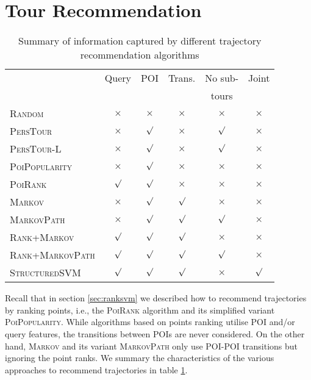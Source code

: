 \section{Tour Recommendation}
\label{sec:recommendation}

\begin{table}[b]
\caption{Summary of information captured by different trajectory recommendation algorithms}
\label{tab:algsummary}
\centering
\setlength{\tabcolsep}{3pt} %
\begin{tabular}{l|*{5}{c}} \hline
                                & Query    & POI      & Trans.     & No sub-      & Joint    \\
                                &          &          &            & tours        &          \\ \hline
\textsc{Random}                 & $\times$ & $\times$ & $\times$   & $\times$     & $\times$ \\
\textsc{PersTour}\cite{ijcai15} & $\times$ & $\surd$  & $\times$   & $\surd$      & $\times$ \\
\textsc{PersTour-L}             & $\times$ & $\surd$  & $\times$   & $\surd$      & $\times$ \\
\textsc{PoiPopularity}          & $\times$ & $\surd$  & $\times$   & $\times$     & $\times$ \\
\textsc{PoiRank}                & $\surd$  & $\surd$  & $\times$   & $\times$     & $\times$ \\
\textsc{Markov}                 & $\times$ & $\surd$  & $\surd$    & $\times$     & $\times$ \\
\textsc{MarkovPath}             & $\times$ & $\surd$  & $\surd$    & $\surd$      & $\times$ \\
\textsc{Rank+Markov}            & $\surd$  & $\surd$  & $\surd$    & $\times$     & $\times$ \\
\textsc{Rank+MarkovPath}        & $\surd$  & $\surd$  & $\surd$    & $\surd$      & $\times$ \\
\textsc{StructuredSVM}          & $\surd$  & $\surd$  & $\surd$    & $\times$     & $\surd$  \\ \hline
\end{tabular}
\end{table}


Recall that in section \ref{sec:ranksvm} we described how to recommend trajectories by ranking points,
i.e., the \textsc{PoiRank} algorithm and its simplified variant \textsc{PoiPopularity}.
While algorithms based on points ranking utilise POI and/or query features, 
the transitions between POIs are never considered.
On the other hand, \textsc{Markov} and its variant \textsc{MarkovPath}
only use POI-POI transitions but ignoring the point ranks.
We summary the characteristics of the various approaches to recommend trajectories in table \ref{tab:algsummary}.

